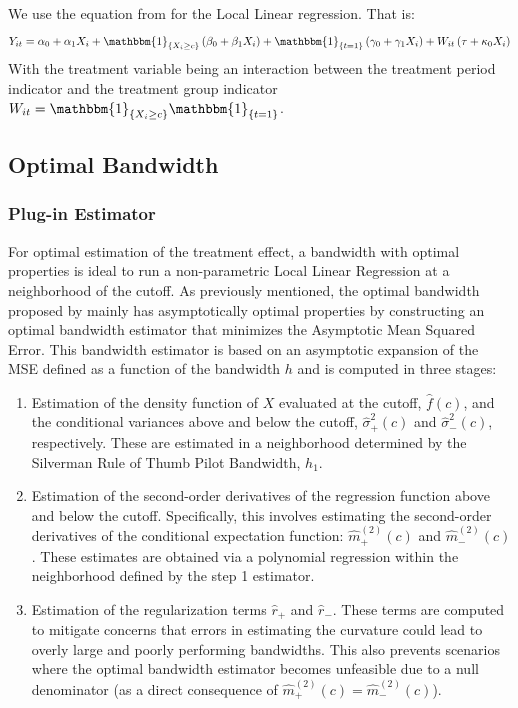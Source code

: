 \documentclass[12pt]{article}
\theoremstyle{plain}
\theoremstyle{remark}
\begin{document}
We use the equation from \textcite{grembi2016do} for the Local Linear regression. That is:
    \begin{equation}\label{grembi_eq}
        Y_{it}=\alpha_0+\alpha_1X_{i}+\mathbbm{1}_{\{X_{i}\geq c\}}\left(\beta_0+\beta_1X_{i}\right)+\mathbbm{1}_{\{t=1\}}\left(\gamma_0+\gamma_1X_{i}\right)+ W_{it} \left(\tau+\kappa_0X_{i}\right)
    \end{equation} 
With the treatment variable being an interaction between the treatment period indicator and the treatment group indicator $W_{it} = \mathbbm{1}_{\{X_i\geq c\}}\mathbbm{1}_{\{t=1\}}$.


\subsection{Optimal Bandwidth}
\subsubsection{Plug-in Estimator \parencite{Imbens2012}}
For optimal estimation of the treatment effect, a bandwidth with optimal properties is ideal to run a non-parametric Local Linear Regression at a neighborhood of the cutoff. As previously mentioned, the optimal bandwidth proposed by \textcite{Imbens2012} mainly has asymptotically optimal properties by constructing an optimal bandwidth estimator that minimizes the Asymptotic Mean Squared Error. This bandwidth estimator is based on an asymptotic expansion of the MSE defined as a function of the bandwidth $h$ and  is computed in three stages:

\begin{enumerate}
    \item Estimation of the density function of $X$ evaluated at the cutoff, $\hat{f}(c)$, and the conditional variances above and below the cutoff, $\hat{\sigma}^2_+(c)$ and $\hat{\sigma}^2_-(c)$, respectively. These are estimated in a neighborhood determined by the Silverman Rule of Thumb Pilot Bandwidth, $h_1$.

    \item Estimation of the second-order derivatives of the regression function above and below the cutoff. Specifically, this involves estimating the second-order derivatives of the conditional expectation function: $\hat{m}^{(2)}_+(c)$ and $\hat{m}^{(2)}_-(c)$. These estimates are obtained via a polynomial regression within the neighborhood defined by the step 1 estimator.

    \item Estimation of the regularization terms $\hat{r}_+$ and $\hat{r}_-$. These terms are computed to mitigate concerns that errors in estimating the curvature could lead to overly large and poorly performing bandwidths. This also prevents scenarios where the optimal bandwidth estimator becomes unfeasible due to a null denominator (as a direct consequence of $\hat{m}^{(2)}_+(c) = \hat{m}^{(2)}_-(c)$).

\end{enumerate}
\end{document}
